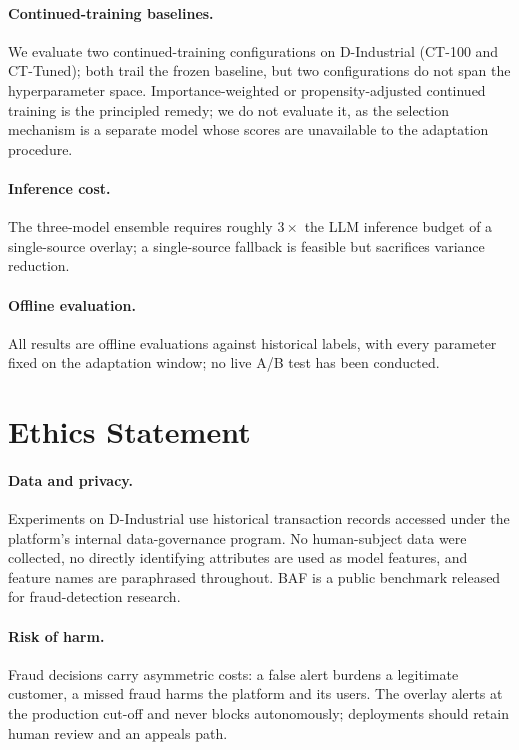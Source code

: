 \documentclass[11pt]{article}
\begin{document}
\paragraph{Continued-training baselines.}
We evaluate two continued-training configurations on D-Industrial (CT-100 and CT-Tuned); both trail
the frozen baseline, but two configurations do not span the hyperparameter space. Importance-weighted
or propensity-adjusted continued training is the principled remedy; we do not evaluate it, as the
selection mechanism is a separate model whose scores are unavailable to the adaptation procedure.

\paragraph{Inference cost.}
The three-model ensemble requires roughly $3\times$ the LLM inference budget of a single-source
overlay; a single-source fallback is feasible but sacrifices variance reduction.

\paragraph{Offline evaluation.}
All results are offline evaluations against historical labels, with every parameter fixed on the
adaptation window; no live A/B test has been conducted.

\section*{Ethics Statement}

\paragraph{Data and privacy.}
Experiments on D-Industrial use historical transaction records accessed under the platform's
internal data-governance program. No human-subject data were collected, no directly identifying
attributes are used as model features, and feature names are paraphrased throughout. BAF is a public
benchmark released for fraud-detection research.

\paragraph{Risk of harm.}
Fraud decisions carry asymmetric costs: a false alert burdens a legitimate customer, a missed fraud
harms the platform and its users. The overlay alerts at the production cut-off and never blocks
autonomously; deployments should retain human review and an appeals path.
\end{document}
